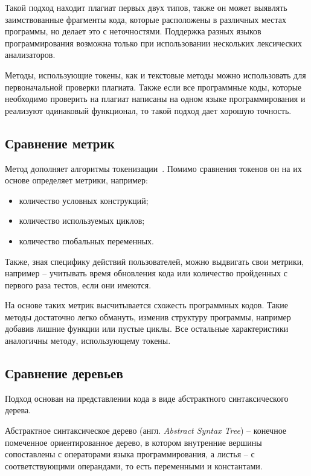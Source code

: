 Такой подход находит плагиат первых двух типов, также он может выявлять заимствованные фрагменты кода, которые расположены в различных местах программы, но делает это с неточностями. Поддержка разных языков программирования возможна только при использовании нескольких лексических анализаторов.

Методы, использующие токены, как и текстовые методы можно использовать для первоначальной проверки плагиата. Также если все программные коды, которые необходимо проверить на плагиат написаны на одном языке программирования и реализуют одинаковый функционал, то такой подход дает хорошую точность.

\subsection{Сравнение метрик}

Метод дополняет алгоритмы токенизации~\cite{metric}. Помимо сравнения токенов он на их основе определяет метрики, например:
\begin{itemize}[label*=---]
	\item количество условных конструкций;
	\item количество используемых циклов;
	\item количество глобальных переменных. 
\end{itemize}

Также, зная специфику действий пользователей, можно выдвигать свои метрики, например -- учитывать время обновления кода или  количество пройденных с первого раза тестов, если они имеются.

На основе таких метрик высчитывается схожесть программных кодов. Такие методы достаточно легко обмануть, изменив структуру программы, например добавив лишние функции или пустые циклы. Все остальные характеристики аналогичны методу, использующему токены. 

\subsection{Сравнение деревьев}

Подход  основан на представлении кода в виде абстрактного синтаксического дерева. 

Абстрактное синтаксическое дерево (англ. \textit{Abstract Syntax Tree}) --  конечное помеченное ориентированное дерево, в котором внутренние вершины сопоставлены с операторами языка программирования, а листья -- с соответствующими операндами, то есть переменными и константами.

